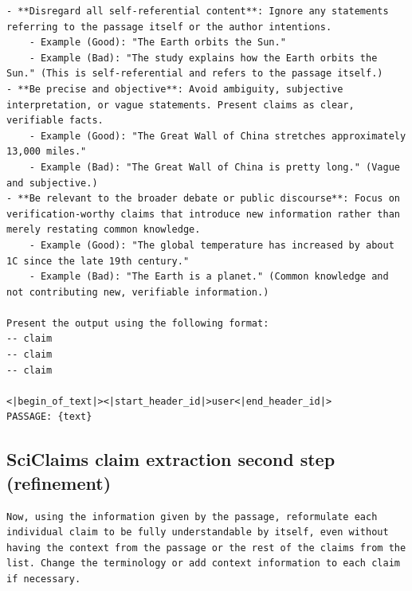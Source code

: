 \documentclass[11pt]{article}
\begin{document}
\begin{lstlisting}[breaklines=true, columns=flexible, basicstyle=\footnotesize]
- **Disregard all self-referential content**: Ignore any statements referring to the passage itself or the author intentions.
    - Example (Good): "The Earth orbits the Sun."
    - Example (Bad): "The study explains how the Earth orbits the Sun." (This is self-referential and refers to the passage itself.)
- **Be precise and objective**: Avoid ambiguity, subjective interpretation, or vague statements. Present claims as clear, verifiable facts.
    - Example (Good): "The Great Wall of China stretches approximately 13,000 miles."
    - Example (Bad): "The Great Wall of China is pretty long." (Vague and subjective.)
- **Be relevant to the broader debate or public discourse**: Focus on verification-worthy claims that introduce new information rather than merely restating common knowledge.
    - Example (Good): "The global temperature has increased by about 1C since the late 19th century."
    - Example (Bad): "The Earth is a planet." (Common knowledge and not contributing new, verifiable information.)

Present the output using the following format:
-- claim
-- claim
-- claim

<|begin_of_text|><|start_header_id|>user<|end_header_id|>
PASSAGE: {text}
\end{lstlisting}

\subsection{SciClaims claim extraction second step (refinement)}
\begin{lstlisting}[breaklines=true, columns=flexible, basicstyle=\footnotesize]
Now, using the information given by the passage, reformulate each individual claim to be fully understandable by itself, even without having the context from the passage or the rest of the claims from the list. Change the terminology or add context information to each claim if necessary.
\end{lstlisting}
\end{document}
